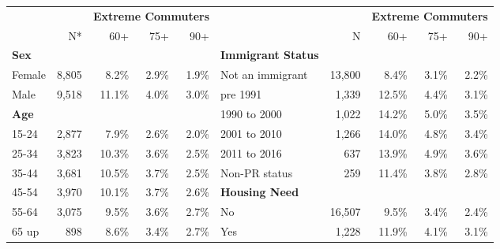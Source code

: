 \documentclass[10 pt,letterpaper]{article}
\begin{document}
\begin{table}[H]
{\begin{tabular}{lrrrrlrrrr}
			\hline
			&                 & \multicolumn{3}{l}{\textbf{Extreme Commuters}}   &                              &        & \multicolumn{3}{l}{\textbf{Extreme Commuters}} \\
			& N*    & 60+       & 75+       & 90+     &                           & N      & 60+       & 75+      & 90+      \\ \hline
			\textbf{Sex}                    &                 &                &                &                & \textbf{Immigrant Status}    &        &                &               &               \\
			Female                          & 8,805           & 8.2\%          & 2.9\%          & 1.9\%          & Not an immigrant             & 13,800 & 8.4\%          & 3.1\%         & 2.2\%         \\
			Male                            & 9,518           & 11.1\%         & 4.0\%          & 3.0\%          & pre 1991                     & 1,339  & 12.5\%         & 4.4\%         & 3.1\%         \\
			\textbf{Age}                    &                 &                &                &                & 1990 to 2000                 & 1,022  & 14.2\%         & 5.0\%         & 3.5\%         \\
			15-24                           & 2,877           & 7.9\%          & 2.6\%          & 2.0\%          & 2001 to 2010                 & 1,266  & 14.0\%         & 4.8\%         & 3.4\%         \\
			25-34                           & 3,823           & 10.3\%         & 3.6\%          & 2.5\%          & 2011 to 2016                 & 637    & 13.9\%         & 4.9\%         & 3.6\%         \\
			35-44                           & 3,681           & 10.5\%         & 3.7\%          & 2.5\%          & Non-PR status                & 259    & 11.4\%         & 3.8\%         & 2.8\%         \\
			45-54                           & 3,970           & 10.1\%         & 3.7\%          & 2.6\%          & \textbf{Housing Need}        &        &                &               &               \\
			55-64                           & 3,075           & 9.5\%          & 3.6\%          & 2.7\%          & No                           & 16,507 & 9.5\%          & 3.4\%         & 2.4\%         \\
			65 up                           & 898             & 8.6\%          & 3.4\%          & 2.7\%          & Yes                          & 1,228  & 11.9\%         & 4.1\%         & 3.1\%         \\

\end{tabular}}
\end{table}
\end{document}
